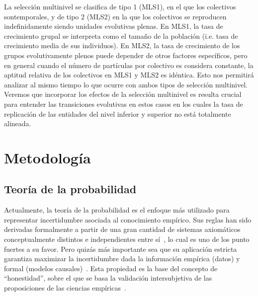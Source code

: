 \documentclass[a4paper,10pt]{article}
\begin{document}
La selección multinivel se clasifica de tipo 1 (MLS1), en el que los colectivos sontemporales, y de tipo 2 (MLS2) en la que los colectivos se reproducen indefinidamente siendo unidades evolutivas plenas.
En MLS1, la tasa de crecimiento grupal se interpreta como el tamaño de la población (i.e. tasa de crecimiento media de sus individuos).
En MLS2, la tasa de crecimiento de los grupos evolutivamente plenos puede depender de otros factores específicos, pero en general cuando el número de partículas por colectivo es considera constante, la aptitud relativa de los colectivos en MLS1 y MLS2 es idéntica.
Esto nos permitirá analizar al mismo tiempo lo que ocurre con ambos tipos de selección multinivel.
Veremos que incorporar los efectos de la selección multinivel es resulta crucial para entender las transiciones evolutivas en estos casos en los cuales la tasa de replicación de las entidades del nivel inferior y superior no está totalmente alineada.

\section{Metodología}

\subsection{Teoría de la probabilidad}

Actualmente, la teoría de la probabilidad es el enfoque más utilizado para representar incertidumbre asociada al conocimiento empírico.
Sus reglas han sido derivadas formalmente a partir de una gran cantidad de sistemas axiomáticos conceptualmente distintos e independientes entre sí~\cite{halpern2017-RAU2}, lo cual es uno de los punto fuertes a su favor.
Pero quizás más importante sea que su aplicación estricta garantiza maximizar la incertidumbre dada la información empírica (datos) y formal (modelos causales)~\cite{jaynes2003}.
Esta propiedad es la base del concepto de ``honestidad'', sobre el que se basa la validación intersubjetiva de las proposiciones de las ciencias empíricas~\cite{landfried2021-conocimientoEmpirico}.
\end{document}
